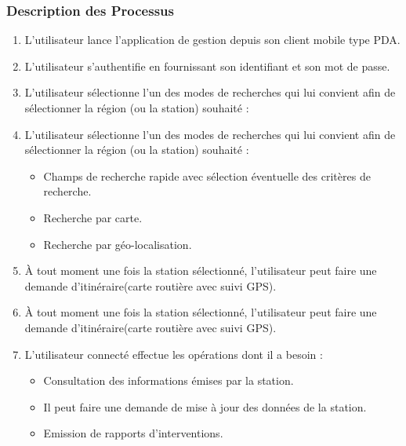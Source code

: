 \subsubsection{Description des Processus}

\begin{enumerate}
\item L'utilisateur lance l'application de gestion depuis son client mobile type PDA.\\
\item L'utilisateur s'authentifie en fournissant son identifiant et son mot de passe.\\

\item L'utilisateur sélectionne l'un des modes de recherches qui lui convient afin de sélectionner
 la région (ou la station) souhaité :\\

\item L'utilisateur sélectionne l'un des modes de recherches qui lui convient afin de sélectionner la région (ou la station) souhaité :\\

	\begin{itemize}
	\item Champs de recherche rapide avec sélection éventuelle des critères de recherche.\\

	\item Recherche par carte.\\

	\item Recherche par géo-localisation.\\
	
	\end{itemize}


	\item À tout moment une fois la station sélectionné, l'utilisateur peut faire une demande 
	d'itinéraire(carte routière avec suivi GPS).\\

	\item À tout moment une fois la station sélectionné, l'utilisateur peut faire une demande d'itinéraire(carte routière avec suivi GPS).\\


	\item L'utilisateur connecté effectue les opérations dont il a besoin :\\
	
	\begin{itemize}
	\item Consultation des informations émises par la station. \\
	\item Il peut faire une demande de mise à jour des données de la station.\\
	\item Emission de rapports d'interventions.\\


\end{itemize}
\end{enumerate}
